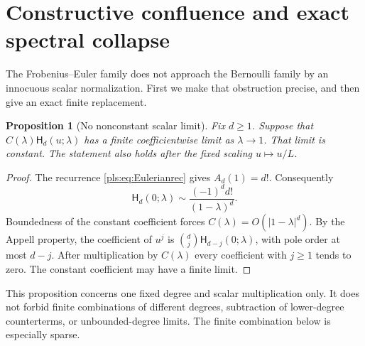 \documentclass[11pt,letterpaper]{article}
\numberwithin{equation}{section}
\newtheorem{proposition}[theorem]{Proposition}
\theoremstyle{definition}
\theoremstyle{remark}\newtheorem{remark}[theorem]{Remark}
\newcommand{\HFE}{\mathsf H}
\begin{document}
\section{Constructive confluence and exact spectral collapse}
\label{pls:sec:mixing}

The Frobenius--Euler family does not approach the Bernoulli family by
an innocuous scalar normalization. First we make that obstruction
precise, and then give an exact finite replacement.

\begin{proposition}[No nonconstant scalar limit]\label{pls:prop:scalar}
Fix $d\ge1$. Suppose that
$C(\lambda)\HFE_d(u;\lambda)$ has a finite coefficientwise limit
as $\lambda\to1$. That limit is constant. The statement also holds
after the fixed scaling $u\mapsto u/L$.
\end{proposition}
\begin{proof}
The recurrence \eqref{pls:eq:Eulerianrec} gives $A_d(1)=d!$.
Consequently
\[
 \HFE_d(0;\lambda)\sim\frac{(-1)^d d!}{(1-\lambda)^d}.
\]
Boundedness of the constant coefficient forces
$C(\lambda)=O(|1-\lambda|^d)$. By the Appell property, the
coefficient of $u^j$ is
$\binom dj\HFE_{d-j}(0;\lambda)$, with pole order at most $d-j$.
After multiplication by $C(\lambda)$ every coefficient with $j\ge1$
tends to zero. The constant coefficient may have a finite limit.
\end{proof}

This proposition concerns one fixed degree and scalar multiplication
only. It does not forbid finite combinations of different degrees,
subtraction of lower-degree counterterms, or unbounded-degree limits.
The finite combination below is especially sparse.
\end{document}
